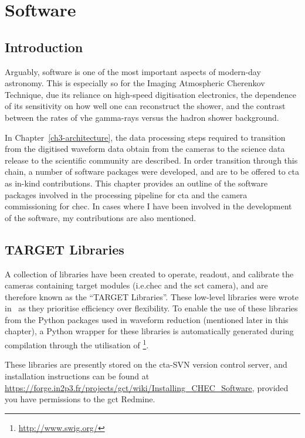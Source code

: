 \chapter{\label{ch4-software}Software} 

\minitoc

\section{Introduction}

Arguably, software is one of the most important aspects of modern-day astronomy. This is especially so for the Imaging Atmospheric Cherenkov Technique, due its reliance on high-speed digitisation electronics, the dependence of its sensitivity on how well one can reconstruct the shower, and the contrast between the rates of \gls{vhe} gamma-rays versus the hadron shower background.

In Chapter~\ref{ch3-architecture}, the data processing steps required to transition from the digitised waveform data obtain from the cameras to the science data release to the scientific community are described. In order transition through this chain, a number of software packages were developed, and are to be offered to \gls{cta} as in-kind contributions. This chapter provides an outline of the software packages involved in the processing pipeline for \gls{cta} and the camera commissioning for \gls{chec}. In cases where I have been involved in the development of the software, my contributions are also mentioned.

\section{TARGET Libraries}

A collection of libraries have been created to operate, readout, and calibrate the cameras containing \gls{target} modules (i.e.\@ \gls{chec} and the \gls{sct} camera), and are therefore known as the ``TARGET Libraries''. These low-level libraries were wrote in \cpp~as  they prioritise efficiency over flexibility. To enable the use of these libraries from the Python packages used in waveform reduction (mentioned later in this chapter), a Python wrapper for these libraries is automatically generated during compilation through the utilisation of \footnote{\url{http://www.swig.org/}}.

These libraries are presently stored on the \gls{cta}-SVN version control server, and installation instructions can be found at \url{https://forge.in2p3.fr/projects/gct/wiki/Installing_CHEC_Software}, provided you have permissions to the \gls{gct} Redmine.

